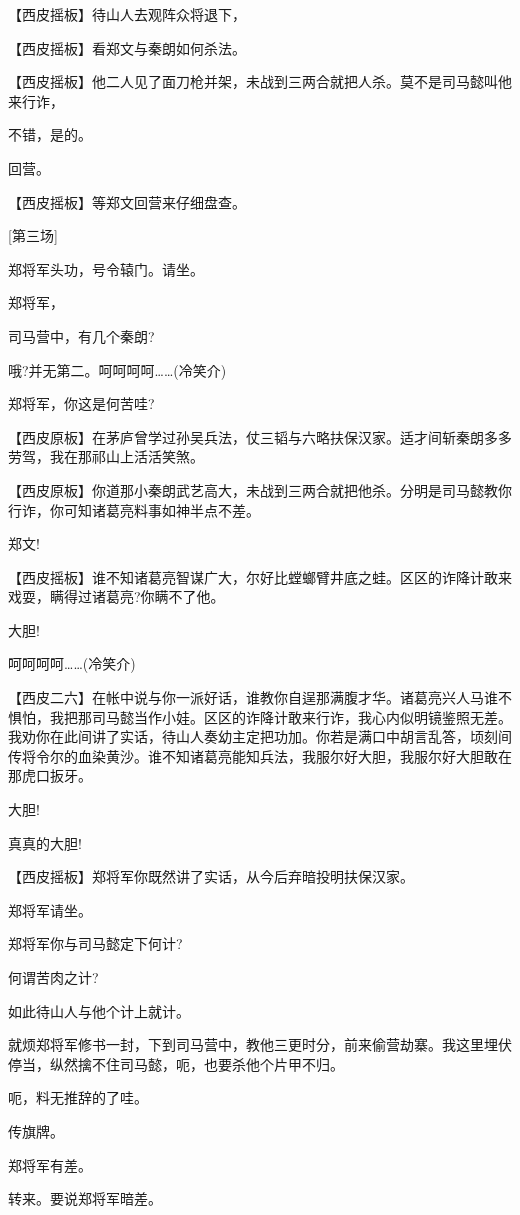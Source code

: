 【西皮摇板】待山人去观阵众将退下，

【西皮摇板】看郑文与秦朗如何杀法。

【西皮摇板】他二人见了面刀枪并架，未战到三两合就把人杀。莫不是司马懿叫他来行诈，

不错，是的。

回营。

【西皮摇板】等郑文回营来仔细盘查。

{[}第三场{]}

郑将军头功，号令辕门。请坐。

郑将军，

司马营中，有几个秦朗?

哦?并无第二。呵呵呵呵\ldots{}\ldots{}(冷笑介)

郑将军，你这是何苦哇?

【西皮原板】在茅庐曾学过孙吴兵法，仗三韬与六略扶保汉家。适才间斩秦朗多多劳驾，我在那祁山上活活笑煞。

【西皮原板】你道那小秦朗武艺高大，未战到三两合就把他杀。分明是司马懿教你行诈，你可知诸葛亮料事如神半点不差。

郑文!

【西皮摇板】谁不知诸葛亮智谋广大，尔好比螳螂臂井底之蛙。区区的诈降计敢来戏耍，瞒得过诸葛亮?你瞒不了他。

大胆!

呵呵呵呵\ldots{}\ldots{}(冷笑介)

【西皮二六】在帐中说与你一派好话，谁教你自逞那满腹才华。诸葛亮兴人马谁不惧怕，我把那司马懿当作小娃。区区的诈降计敢来行诈，我心内似明镜鉴照无差。我劝你在此间讲了实话，待山人奏幼主定把功加。你若是满口中胡言乱答，顷刻间传将令尔的血染黄沙。谁不知诸葛亮能知兵法，我服尔好大胆，我服尔好大胆敢在那虎口扳牙。

大胆!

真真的大胆!

【西皮摇板】郑将军你既然讲了实话，从今后弃暗投明扶保汉家。

郑将军请坐。

郑将军你与司马懿定下何计?

何谓苦肉之计?

如此待山人与他个计上就计。

就烦郑将军修书一封，下到司马营中，教他三更时分，前来偷营劫寨。我这里埋伏停当，纵然擒不住司马懿，呃，也要杀他个片甲不归。

呃，料无推辞的了哇。

传旗牌。

郑将军有差。

转来。要说郑将军暗差。

